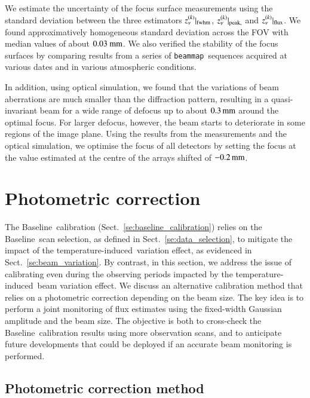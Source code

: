\documentclass[traditionalabstract]{aa}
\newcommand{\bm}{{\tt beammap}}
\newcommand{\afternoon}{temperature-induced}
\newcommand{\baseline}{Baseline}%
\newcommand{\lp}[1]{#1}
\begin{document}
{\begin{appendix}
We estimate the uncertainty of the focus
surface measurements using the standard deviation between the three
estimators $z_\nu^{(k)}|_{\rm{fwhm}}$, $z_\nu^{(k)}|_{\rm{peak,}}$ and
$z_\nu^{(k)}|_{\rm{flux}}$. We found approximatively homogeneous
standard deviation across the FOV with median values of about
$0.03~\rm{mm}$. We also verified the stability of the focus surfaces by comparing
results from a series of \bm\ sequences acquired at various dates and
in various atmospheric conditions.

{\lp In addition, using optical simulation, we found that the
variations of beam aberrations are much smaller than the
diffraction pattern, resulting in a quasi-invariant beam for a
wide range of defocus up to about $0.3\, \rm{mm}$ around the optimal
focus. For larger defocus, however, the beam starts to deteriorate in
some regions of the image plane.}
{\lp Using the results from the measurements and the optical
simulation, we optimise the focus of all detectors by setting the
focus at the value estimated at the centre of the arrays shifted of
$-0.2\,\rm{mm}$.}


%
%
  \section{Photometric correction}
  \label{se:photometric_correction}
 

The \baseline\ calibration (Sect.~\ref{se:baseline_calibration}) relies on
the \baseline\ scan selection, as defined in
Sect.~\ref{se:data_selection}, to mitigate the impact of
the \afternoon\ variation effect, as evidenced in Sect.~\ref{se:beam_variation}.
By contrast, in this section, we
address the issue of calibrating even during the observing periods
impacted by the \afternoon\ beam variation effect. We discuss an
alternative calibration method that
relies on a photometric correction depending on the beam size.
{\lp The key idea is to perform a joint monitoring of flux estimates
  using the fixed-width Gaussian amplitude and the beam size.}
The objective is both to cross-check the \baseline\ calibration results
using more observation scans, and to anticipate future developments
that could be deployed if an accurate beam monitoring is performed.


\subsection{Photometric correction method}
\label{se:photometric_correction_method}


\end{appendix}}
\end{document}
